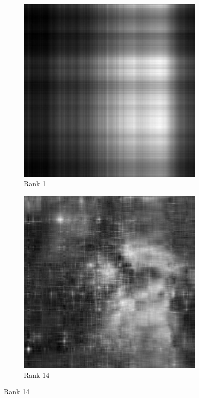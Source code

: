 \begin{figure}
\centering
\begin{subfigure}[b]{.35\textwidth}
\centering
\includegraphics[width=\textwidth]{rank1.jpg}
\caption{Rank 1}
\end{subfigure}
\begin{subfigure}[b]{.35\textwidth}
\centering
\includegraphics[width=\textwidth]{rank14.jpg}
\caption{Rank 14}
\end{subfigure}


\end{figure}

